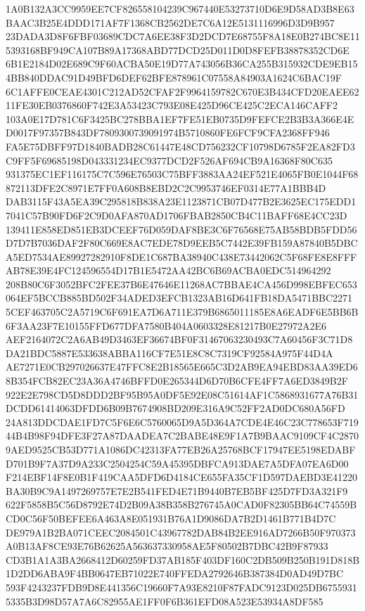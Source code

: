 \documentclass[UTF8,fontset=fandol,zihao=-4,a4paper]{ctexart}
\begin{document}
{{1A0B132A3CC9959EE7CF826558104239C967440E53273710D6E9D58AD3B8E63BAAC3B25E4DDD171AF7F1368CB2562DE7C6A12E5131116996D3D9B957
23DADA3D8F6FBF03689CDC7A6EE38F3D2DCD7E68755F8A18E0B274BC8E115393168BF949CA107B89A17368ABD77DCD25D011D0D8FEFB38878352CD6E
6B1E2184D02E689C9F60ACBA50E19D77A743056B36CA255B315932CDE9EB154BB840DDAC91D49BFD6DEF62BFE878961C07558A84903A1624C6BAC19F
6C1AFFE0CEAE4301C212AD52CFAF2F9964159782C670E3B434CFD20EAEE6211FE30EB0376860F742E3A53423C793E08E425D96CE425C2ECA146CAFF2
103A0E17D781C6F3425BC278BBA1EF7FE51EB0735D9FEFCE2B3B3A366E4ED0017F97357B843DF7809300739091974B5710860FE6FCF9CFA2368FF946
FA5E75DBFF97D1840BADB28C61447E48CD756232CF10798D6785F2EA82FD3C9FF5F69685198D043331234EC9377DCD2F526AF694CB9A16368F80C635
931375EC1EF116175C7C596E76503C75BFF3883AA24EF521E4065FB0E1044F68872113DFE2C8971E7FF0A608B8EBD2C2C9953746EF0314E77A1BBB4D
DAB3115F43A5EA39C295818B838A23E1123871CB07D477B2E3625EC175EDD17041C57B90FD6F2C9D0AFA870AD1706FBAB2850CB4C11BAFF68E4CC23D
139411E858ED851EB3DCEEF76D059DAF8BE3C6F76568E75AB58BDB5FDD56D7D7B7036DAF2F80C669E8AC7EDE78D9EEB5C7442E39FB159A87840B5DBC
A5ED7534AE89927282910F8DE1C687BA38940C438E73442062C5F68FE8E8FFFAB78E39E4FC124596554D17B1E5472AA42BC6B69ACBA0EDC514964292
208B80C6F3052BFC2FEE37B6E47646E11268AC7BBAE4CA456D998EBFEC653064EF5BCCB885BD502F34ADED3EFCB1323AB16D641FB18DA5471BBC2271
5CEF463705C2A5719C6F691EA7D6A711E379B6865011185E8A6EADF6E5BB6B6F3AA23F7E10155FFD677DFA7580B404A0603328E81217B0E27972A2E6
AEF2164072C2A6AB49D3463EF36674BF0F31467063230493C7A60456F3C71D8DA21BDC5887E533638ABBA116CF7E51E8C8C7319CF92584A975F44D4A
AE7271E0CB297026637E47FFC8E2B18565E665C3D2AB9EA94EBD83AA39ED68B354FCB82EC23A36A4746BFFD0E265344D6D70B6CFE4FF7A6ED3849B2F
922E2E798CD5D8DDD2BF95B95A0DF5E92E08C51614AF1C5868931677A76B31DCDD61414063DFDD6B09B7674908BD209E316A9C52FF2AD0DC680A56FD
24A813DDCDAE1FD7C5F6E6C5760065D9A5D364A7CDE4E46C23C778653F71944B4B98F94DFE3F27A87DAADEA7C2BABE48E9F1A7B9BAAC9109CF4C2870
9AED9525CB53D771A1086DC42313FA77EB26A25768BCF17947EE5198EDABFD701B9F7A37D9A233C2504254C59A45395DBFCA913DAE7A5DFA07EA6D00
F214EBF14F8E0B1F419CAA5DFD6D4184CE655FA35CF1D597DAEBD3E41220BA30B9C9A1497269757E7E2B541FED4E71B9440B7EB5BF425D7FD3A321F9
622F5858B5C56D8792E74D2B09A38B358B276745A0CAD0F82305BB64C74559BCD0C56F50BEFEE6A463A8E051931B76A1D9086DA7B2D1461B771B4D7C
DE979A1B2BA071CEEC2084501C43967782DAB84B2EE916AD7266B50F970373A0B13AF8CE93E76B62625A563637330958AE5F80502B7DBC42B9F87933
CD3B1A1A3BA2668412D60259FD37AB185F403DF160C2DB509B250B191D818B1D2DD6ABA9F4BB0647EB71022E740FFEDA2792646B387384D0AD49D7BC
593F4243237FDB9D8E441356C19660F7A93E8210F87FADC9123D025DB67559315335B3D98D57A7A6C82955AE1FF0F6B361EFD08A523E53934A8DF585
}}
\end{document}
